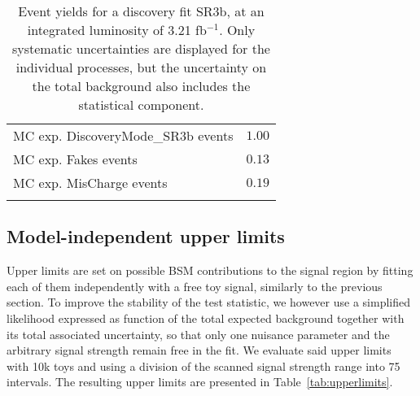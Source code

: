 \begin{table}
\begin{center}
{\begin{tabular*}{\textwidth}{@{\extracolsep{\fill}}lr}
        MC exp. DiscoveryMode\_SR3b events         & $1.00$              \\
        MC exp. Fakes events         & $0.13$              \\
        MC exp. MisCharge events         & $0.19$              \\
\noalign{\smallskip}\hline\noalign{\smallskip}
\end{tabular*}
}
\end{center}
\caption{Event yields for a discovery fit SR3b, at an integrated luminosity of 3.21 fb$^{-1}$. Only systematic uncertainties are displayed for the individual processes, but the uncertainty on the total background also includes the statistical component.}
\label{tab:histfitter:yields:disc:SR3b}
\end{table}
%


\subsection{Model-independent upper limits}
Upper limits are set on possible BSM contributions to the signal region by fitting each of them independently with a free toy signal, similarly to the previous section. 
To improve the stability of the test statistic, we however use a simplified likelihood expressed as function of the total expected background together 
with its total associated uncertainty, so that only one nuisance parameter and the arbitrary signal strength remain free in the fit. 
We evaluate said upper limits with 10k toys and using a division of the scanned signal strength range into 75 intervals. 
The resulting upper limits are presented in Table~\ref{tab:upperlimits}. 


